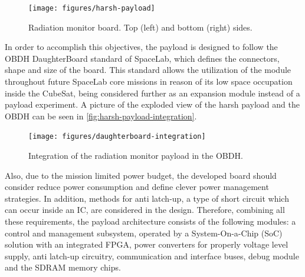 \begin{figure}[!ht]
    \begin{center}
        \texttt{[image: figures/harsh-payload]}
        \caption{Radiation monitor board. Top (left) and bottom (right) sides.}
        \label{fig:harsh-payload}
    \end{center}
\end{figure}

In order to accomplish this objectives, the payload is designed to follow the OBDH DaughterBoard standard of SpaceLab, which defines the connectors, shape and size of the board. This standard allows the utilization of the module throughout future SpaceLab core missions in reason of its low space occupation inside the CubeSat, being considered further as an expansion module instead of a payload experiment. A picture of the exploded view of the harsh payload and the OBDH can be seen in \autoref{fig:harsh-payload-integration}.

\begin{figure}[!ht]
    \begin{center}
        \texttt{[image: figures/daughterboard-integration]}
        \caption{Integration of the radiation monitor payload in the OBDH.}
        \label{fig:harsh-payload-integration}
    \end{center}
\end{figure}

Also, due to the mission limited power budget, the developed board should consider reduce power consumption and define clever power management strategies. In addition, methods for anti latch-up, a type of short circuit which can occur inside an IC, are considered in the design. Therefore, combining all these requirements, the payload architecture consists of the following modules: a control and management subsystem, operated by a System-On-a-Chip (SoC) solution with an integrated FPGA, power converters for properly voltage level supply, anti latch-up circuitry, communication and interface buses, debug module and the SDRAM memory chips.
